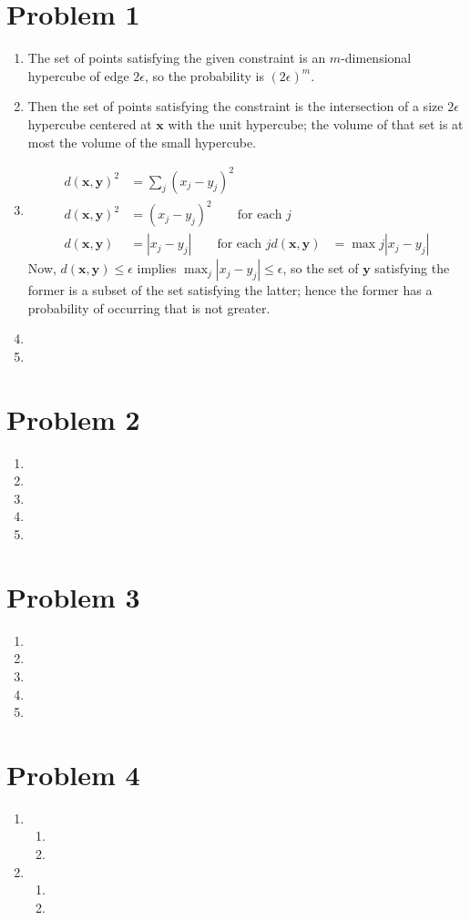 \documentclass{article}
\author{Danny Zhu \& Tianhui Cai}
\let\b\mathbf
\begin{document}
\maketitle

\section*{Problem 1}
\begin{enumerate}
\item The set of points satisfying the given constraint is an
  $m$-dimensional hypercube of edge $2\epsilon$, so the probability is
  $(2\epsilon)^m$.
\item Then the set of points satisfying the constraint is the
  intersection of a size $2\epsilon$ hypercube centered at $\mathbf x$
  with the unit hypercube; the volume of that set is at most the
  volume of the small hypercube.
\item 
  \begin{align*}
    d(\b x,\b y)^2&=\sum_j(x_j-y_j)^2\\
    d(\b x,\b y)^2&=(x_j-y_j)^2\qquad\textrm{for each $j$}\\
    d(\b x,\b y)&=|x_j-y_j|\qquad\textrm{for each $j$}
    d(\b x,\b y)&=\max j|x_j-y_j|
  \end{align*}
  Now, $d(\b x,\b y)\le\epsilon$ implies $\max_j|x_j-y_j|\le\epsilon$,
  so the set of $\b y$ satisfying the former is a subset of the set
  satisfying the latter; hence the former has a probability of
  occurring that is not greater.
\item 
\item 
\end{enumerate}
\section*{Problem 2}
\begin{enumerate}
\item 
\item 
\item 
\item 
\item 
\end{enumerate}
\section*{Problem 3}
\begin{enumerate}
\item 
\item 
\item 
\item 
\item 
\end{enumerate}
\section*{Problem 4}
\begin{enumerate}
\item 
  \begin{enumerate}
  \item 
  \item 
  \end{enumerate}
\item 
  \begin{enumerate}
  \item 
  \item 
  \end{enumerate}
\end{enumerate}
\end{document}
